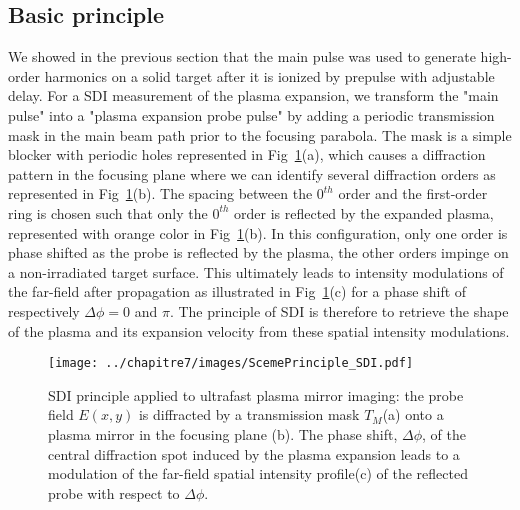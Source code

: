 

\subsection{Basic principle} \label{subsubsection:Principle of the method}

We showed in the previous section that the main pulse was used to generate high-order harmonics on a solid target after it is ionized by prepulse with adjustable delay. For a SDI measurement of the plasma expansion, we transform the "main pulse" into a "plasma expansion probe pulse" by adding a periodic transmission mask in the main beam path prior to the focusing parabola. The mask is a simple blocker with periodic holes represented in Fig~\ref{fig:ScemePrinciple_SDI}(a), which causes a diffraction pattern in the focusing plane where we can identify several diffraction orders as represented in Fig~\ref{fig:ScemePrinciple_SDI}(b).
The spacing between the $0^{th}$ order and the first-order ring is chosen such that only the $0^{th}$ order is reflected by the expanded plasma, represented with orange color in Fig~\ref{fig:ScemePrinciple_SDI}(b). In this configuration, only one order is phase shifted as the probe is reflected by the plasma, the other orders impinge on a non-irradiated target surface. This ultimately leads to intensity modulations of the far-field after propagation as illustrated in Fig~\ref{fig:ScemePrinciple_SDI}(c) for a phase shift of respectively $\Delta \phi =0$ and $\pi$. The principle of SDI is therefore to retrieve the shape of the plasma and its expansion velocity from these spatial intensity modulations.\\




\begin{figure}[H]
\centering
\texttt{[image: ../chapitre7/images/ScemePrinciple\_SDI.pdf]}\\
\caption{\label{fig:ScemePrinciple_SDI} SDI principle applied to ultrafast plasma mirror imaging: the probe field $E(x,y)$ is diffracted by a transmission mask $T_M$(a) onto a plasma mirror in the focusing plane (b). The phase shift, $\Delta\phi$, of the central diffraction spot induced by the plasma expansion leads to a modulation of the far-field spatial intensity profile(c) of the reflected probe with respect to $\Delta\phi$.}
\end{figure}


